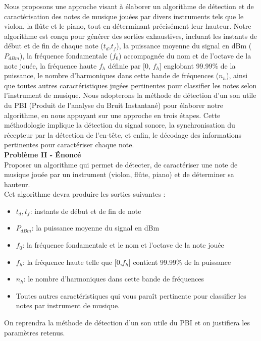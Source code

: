 Nous proposons une approche visant à élaborer un algorithme de détection et de caractérisation des notes de musique jouées par divers instruments tels que le violon, la flûte et le piano, tout en déterminant précisément leur hauteur. Notre algorithme est conçu pour générer des sorties exhaustives, incluant les instants de début et de fin de chaque note ($t_d$,$t_f$), la puissance moyenne du signal en dBm ($P_{dBm}$), la fréquence fondamentale ($f_0$) accompagnée du nom et de l’octave de la note jouée, la fréquence haute $f_h$ définie par [0, $f_h$] englobant 99.99\% de la puissance, le nombre d’harmoniques dans cette bande de fréquences ($n_h$), ainsi que toutes autres caractéristiques jugées pertinentes pour classifier les notes selon l'instrument de musique. Nous adopterons la méthode de détection d’un son utile du PBI (Produit de l'analyse du Bruit Instantané) pour élaborer notre algorithme, en nous appuyant sur une approche en trois étapes. Cette méthodologie implique la détection du signal sonore, la synchronisation du récepteur par la détection de l'en-tête, et enfin, le décodage des informations pertinentes pour caractériser chaque note. 
\newline
\\
\textbf{Problème II - Énoncé } \  \\
Proposer un algorithme qui permet de détecter, de caractériser une note de musique jouée par un instrument (violon, flûte, piano) et de déterminer sa hauteur. \\
Cet algorithme devra produire les sorties suivantes : \\
\begin{itemize}
    \item $t_d, t_f$: instants de début et de fin de note
    \item $P_{dBm}$: la puissance moyenne du signal en dBm
    \item $f_0$: la fréquence fondamentale et le nom et l'octave de la note jouée
    \item $f_h$: la fréquence haute telle que [0,$f_h$] contient 99.99\% de la puissance
    \item $n_h$: le nombre d'harmoniques dans cette bande de fréquences
    \item Toutes autres caractéristiques qui vous paraît pertinente pour classifier les notes par instrument de musique.
\end{itemize}
 On reprendra la méthode de détection d'un son utile du PBI et on justifiera les paramètres retenus.
